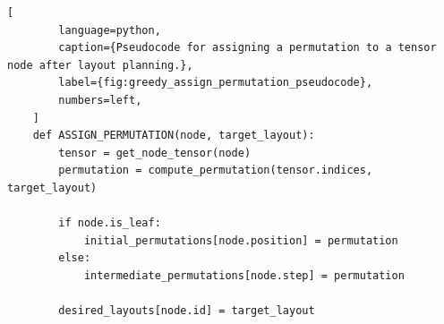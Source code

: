 \newpage
\begin{center}
    \begin{lstlisting}[
        language=python,
        caption={Pseudocode for assigning a permutation to a tensor node after layout planning.},
        label={fig:greedy_assign_permutation_pseudocode},
        numbers=left,
    ]
    def ASSIGN_PERMUTATION(node, target_layout):
        tensor = get_node_tensor(node)
        permutation = compute_permutation(tensor.indices, target_layout)

        if node.is_leaf:
            initial_permutations[node.position] = permutation
        else:
            intermediate_permutations[node.step] = permutation

        desired_layouts[node.id] = target_layout
    \end{lstlisting}
\end{center}